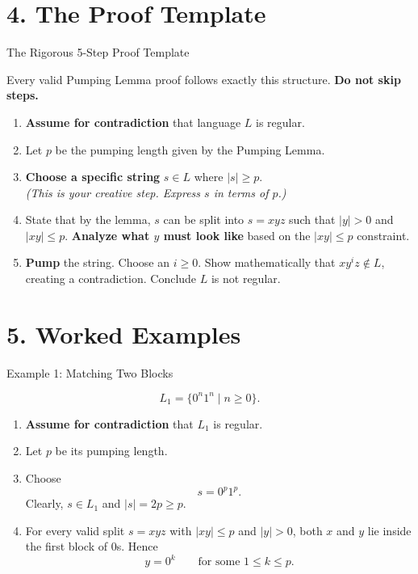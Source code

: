 \documentclass[10pt,aspectratio=169]{beamer}
\begin{document}
\section{4. The Proof Template}

\begin{frame}{The Rigorous 5-Step Proof Template}

Every valid Pumping Lemma proof follows exactly this structure. \textbf{Do not skip steps.}

\vspace{0.5em}
\begin{enumerate}
    \item \textbf{Assume for contradiction} that language $L$ is regular.
    \item Let $p$ be the pumping length given by the Pumping Lemma.
    \item \textbf{Choose a specific string} $s \in L$ where $|s| \geq p$. \\
          \textit{(This is your creative step. Express $s$ in terms of $p$.)}
    \item State that by the lemma, $s$ can be split into $s = xyz$ such that $|y|>0$ and $|xy| \le p$. \textbf{Analyze what $y$ must look like} based on the $|xy| \le p$ constraint.
    \item \textbf{Pump} the string. Choose an $i \ge 0$. Show mathematically that $xy^iz \notin L$, creating a contradiction. Conclude $L$ is not regular.
\end{enumerate}

\end{frame}


\section{5. Worked Examples}

\begin{frame}{Example 1: Matching Two Blocks}

\small
\[
L_1=\{0^n1^n\mid n\geq 0\}.
\]

\begin{enumerate}
    \item \textbf{Assume for contradiction} that $L_1$ is regular.
    \item Let $p$ be its pumping length.
    \item Choose
    \[
    s=0^p1^p.
    \]
    Clearly, $s\in L_1$ and $|s|=2p\geq p$.
    \item For every valid split $s=xyz$ with $|xy|\leq p$ and $|y|>0$, both $x$ and $y$ lie inside the first block of $0$s. Hence
    \[
    y=0^k\qquad\text{for some }1\leq k\leq p.
    \]
\end{enumerate}

\end{frame}
\end{document}
